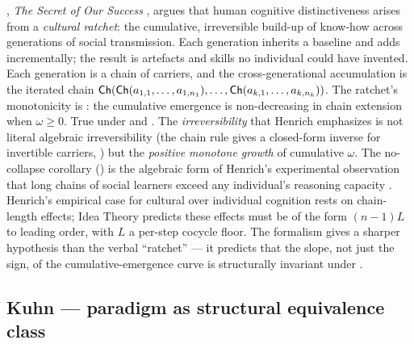 \begin{zooentry*}
, \emph{The Secret of Our Success}
\cite{Henrich2015}, argues that human cognitive distinctiveness
arises from a \emph{cultural ratchet}: the cumulative, irreversible
build-up of know-how across generations of social transmission. Each
generation inherits a baseline and adds incrementally; the result is
artefacts and skills no individual could have invented.
\formalclaim Each generation is a chain of carriers, and the
cross-generational accumulation is the iterated chain
$\mathsf{Ch}(\mathsf{Ch}(a_{1,1},\dots,a_{1,n_1}),\dots,\mathsf{Ch}(a_{k,1},\dots,
a_{k,n_k}))$. The ratchet's monotonicity is
: the cumulative emergence is non-decreasing in
chain extension when $\omega\ge 0$.
\formalstatus
True under  and . The
\emph{irreversibility} that Henrich emphasizes is not literal
algebraic irreversibility (the chain rule gives a closed-form
inverse for invertible carriers, ) but the
\emph{positive monotone growth} of cumulative $\omega$. The
no-collapse corollary () is the algebraic form
of Henrich's experimental observation that long chains of social
learners exceed any individual's reasoning capacity \cite{Henrich2015}.
\litcomment
Henrich's empirical case for cultural over individual cognition rests
on chain-length effects; Idea Theory predicts these effects must be
of the form $(n-1)L$ to leading order, with $L$ a per-step cocycle
floor. The formalism gives a sharper hypothesis than the verbal
``ratchet'' --- it predicts that the slope, not just the sign, of the
cumulative-emergence curve is structurally invariant under
.
\end{zooentry*}

\subsection{Kuhn --- paradigm as structural equivalence class}
\label{zoo:kuhn}

